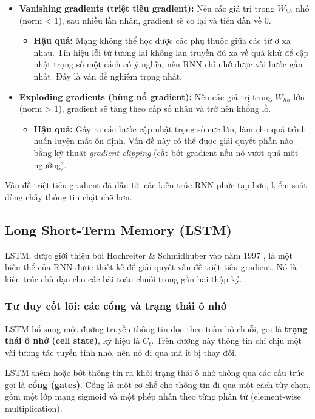 \begin{itemize}
    \item \textbf{Vanishing gradients (triệt tiêu gradient):} Nếu các giá trị trong $W_{hh}$ nhỏ (norm < 1), sau nhiều lần nhân, gradient sẽ co lại và tiến dần về 0.
        \begin{itemize}
            \item \textbf{Hậu quả:} Mạng không thể học được các phụ thuộc giữa các từ ở xa nhau. Tín hiệu lỗi từ tương lai không lan truyền đủ xa về quá khứ để cập nhật trọng số một cách có ý nghĩa, nên RNN chỉ nhớ được vài bước gần nhất. Đây là vấn đề nghiêm trọng nhất.
        \end{itemize}
    \item \textbf{Exploding gradients (bùng nổ gradient):} Nếu các giá trị trong $W_{hh}$ lớn (norm > 1), gradient sẽ tăng theo cấp số nhân và trở nên khổng lồ.
        \begin{itemize}
            \item \textbf{Hậu quả:} Gây ra các bước cập nhật trọng số cực lớn, làm cho quá trình huấn luyện mất ổn định. Vấn đề này có thể được giải quyết phần nào bằng kỹ thuật \textit{gradient clipping} (cắt bớt gradient nếu nó vượt quá một ngưỡng).
        \end{itemize}
\end{itemize}

Vấn đề triệt tiêu gradient đã dẫn tới các kiến trúc RNN phức tạp hơn, kiểm soát dòng chảy thông tin chặt chẽ hơn.

\subsection{Long Short-Term Memory (LSTM)}
\label{ssec:lstm}
LSTM, được giới thiệu bởi Hochreiter \& Schmidhuber vào năm 1997 \cite{hochreiter1997long}, là một biến thể của RNN được thiết kế để giải quyết vấn đề triệt tiêu gradient. Nó là kiến trúc chủ đạo cho các bài toán chuỗi trong gần hai thập kỷ.

\subsubsection{Tư duy cốt lõi: các cổng và trạng thái ô nhớ}
LSTM bổ sung một đường truyền thông tin dọc theo toàn bộ chuỗi, gọi là \textbf{trạng thái ô nhớ (cell state)}, ký hiệu là $C_t$. Trên đường này thông tin chỉ chịu một vài tương tác tuyến tính nhỏ, nên nó đi qua mà ít bị thay đổi.

LSTM thêm hoặc bớt thông tin ra khỏi trạng thái ô nhớ thông qua các cấu trúc gọi là \textbf{cổng (gates)}. Cổng là một cơ chế cho thông tin đi qua một cách tùy chọn, gồm một lớp mạng sigmoid và một phép nhân theo từng phần tử (element-wise multiplication).

